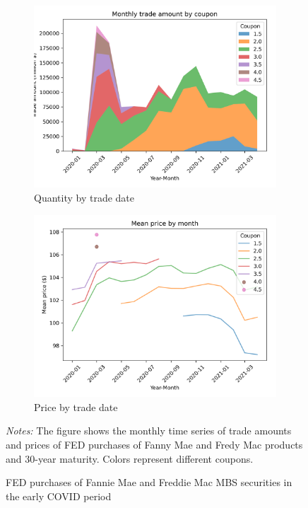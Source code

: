\documentclass[11pt,a4paper]{article}
\begin{document}
\begin{figure}[h]
    \centering
    \begin{subfigure}[b]{0.49\textwidth}
      \includegraphics[width=0.998\textwidth]{../results/figures/fed_monthly_trade_amount_by_coupon.png}
      \caption{ Quantity by trade date}
     \end{subfigure}
     \begin{subfigure}[b]{0.49\textwidth}
      \includegraphics[width=0.998\textwidth]{../results/figures/fed_monthly_price_mean_by_coupon.png}
      \caption{ Price by trade date}
     \end{subfigure}
     \caption{FED purchases of Fannie Mae and Freddie Mac MBS securities  in the early COVID period} 
     \begin{minipage}{\textwidth}
      \footnotesize{\textit{Notes:} The figure shows the monthly time series of trade amounts and prices of FED purchases of Fanny Mae and Fredy Mac products and 30-year maturity. Colors represent different coupons. } 
        \end{minipage}
\end{figure}
\end{document}
